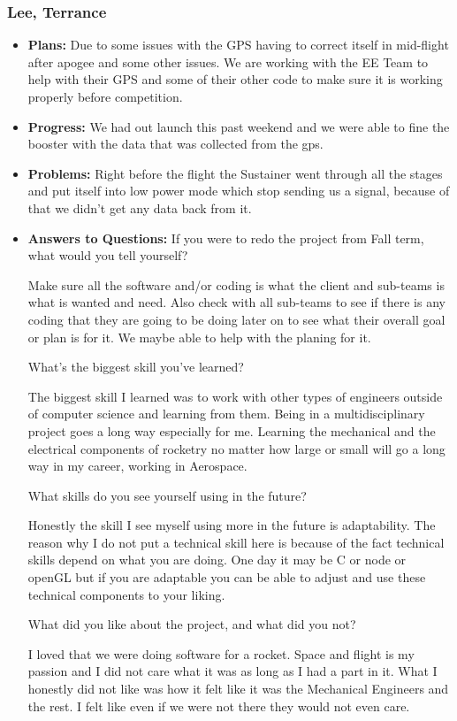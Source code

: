 \documentclass[10pt,draftclsnofoot,onecolumn]{IEEEtran}
\begin{document}
\subsubsection{Lee, Terrance}
\begin{itemize}
	\item \textbf{Plans: }
	Due to some issues with the GPS having to correct itself in mid-flight after apogee and some other issues. We are working with the EE Team to help with their GPS and some of their other code to make sure it is working properly before competition.
	\item \textbf{Progress:  }
	We had out launch this past weekend and we were able to fine the booster with the data that was collected from the gps.
	\item \textbf{Problems: }
	Right before the flight the Sustainer went through all the stages and put itself into low power mode which stop sending us a signal, because of that we didn't get any data back from it.
	\item\textbf{Answers to Questions: }
	If you were to redo the project from Fall term, what would you tell yourself?

	Make sure all the software and/or coding is what the client and sub-teams is what is wanted and need. Also check with all sub-teams to see if there is any coding that they are going to be doing later on to see what their overall goal or plan is for it. We maybe able to help with the planing for it.

	What's the biggest skill you've learned?

	The biggest skill I learned was to work with other types of engineers outside of computer science and learning from them. Being in a multidisciplinary project goes a long way especially for me. Learning the mechanical and the electrical components of rocketry no matter how large or small will go a long way in my career, working in Aerospace.

	What skills do you see yourself using in the future?

	Honestly the skill I see myself using more in the future is adaptability. The reason why I do not put a technical skill here is because of the fact technical skills depend on what you are doing. One day it may be C or node or openGL but if you are adaptable you can be able to adjust and use these technical components to your liking.

	What did you like about the project, and what did you not?

	I loved that we were doing software for a rocket. Space and flight is my passion and I did not care what it was as long as I had a part in it. What I honestly did not like was how it felt like it was the Mechanical Engineers and the rest. I felt like even if we were not there they would not even care.


\end{itemize}
\end{document}
